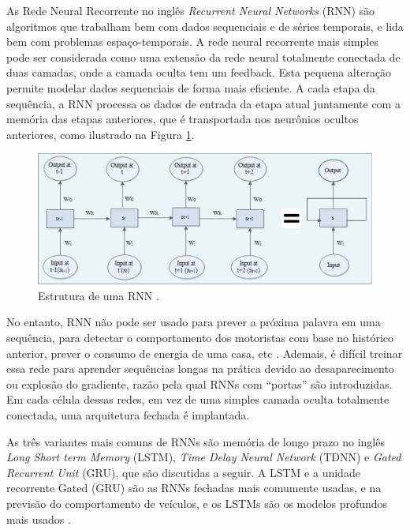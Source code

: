 
As Rede Neural Recorrente no inglês \textit{Recurrent Neural Networks} (RNN) são algoritmos que trabalham bem com dados sequenciais e de séries temporais, e lida bem com problemas espaço-temporais. A rede neural recorrente mais simples pode ser considerada como uma extensão da rede neural totalmente conectada de duas camadas, onde a camada oculta tem um feedback. Esta pequena alteração permite modelar dados sequenciais de forma mais eficiente. A cada etapa da sequência, a RNN processa os dados de entrada da etapa atual juntamente com a memória das etapas anteriores, que é transportada nos neurônios ocultos anteriores, como ilustrado na Figura \ref{RNN}.

\begin{figure}[H]
\centering
\includegraphics[width=\textwidth]{Figures/RNN.png}
\caption{Estrutura de uma RNN \cite{software-cnn}.}
\label{RNN}
\end{figure}

No entanto, RNN não pode ser usado para prever a próxima palavra em uma sequência, para detectar o comportamento dos motoristas com base no histórico anterior, prever o consumo de energia de uma casa, etc \cite{software-cnn}. Ademais, é difícil treinar essa rede para aprender sequências longas na prática devido ao desaparecimento ou explosão do gradiente, razão pela qual RNNs com “portas” são introduzidas. Em cada célula dessas redes, em vez de uma simples camada oculta totalmente conectada, uma arquitetura fechada é implantada. 

As três variantes mais comuns de RNNs são memória de longo prazo no inglês \textit{Long Short term Memory} (LSTM), \textit{Time Delay Neural Network} (TDNN) e \textit{Gated Recurrent Unit} (GRU), que são discutidas a seguir.
A LSTM e a unidade recorrente Gated (GRU) são as RNNs fechadas mais comumente usadas, e na previsão do comportamento de veículos, e os LSTMs são os modelos profundos mais usados \cite{software-review}.


